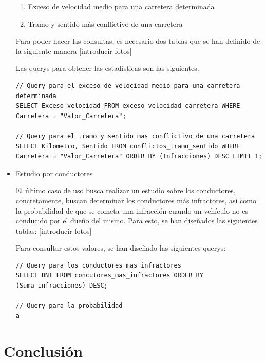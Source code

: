\documentclass[]{article}
\begin{document}
\begin{itemize}
    \begin{enumerate}
        \item Exceso de velocidad medio para una carretera determinada
        \item Tramo y sentido más conflictivo de una carretera 
    \end{enumerate}

    Para poder hacer las consultas, es necesario dos tablas que se han definido de la siguiente manera [introducir fotos]

    Las querys para obtener las estadísticas son las siguientes:

    \begin{lstlisting}[language=cql, caption=Querys para el caso de uso 2]
// Query para el exceso de velocidad medio para una carretera determinada
SELECT Exceso_velocidad FROM exceso_velocidad_carretera WHERE Carretera = "Valor_Carretera";

// Query para el tramo y sentido mas conflictivo de una carretera
SELECT Kilometro, Sentido FROM conflictos_tramo_sentido WHERE Carretera = "Valor_Carretera" ORDER BY (Infracciones) DESC LIMIT 1;
    \end{lstlisting}
 
    \item Estudio por conductores

    El último caso de uso busca realizar un estudio sobre los conductores, concretamente, buscan determinar los conductores más infractores, así como la probabilidad de que se cometa una infracción cuando un vehículo no es conducido por el dueño del mismo. Para esto, se han diseñados las siguientes tablas: [introducir fotos]

    Para consultar estos valores, se han diseñado las siguientes querys:

    \begin{lstlisting}[language=cql, caption=Querys para el caso de uso 3]
// Query para los conductores mas infractores
SELECT DNI FROM concutores_mas_infractores ORDER BY (Suma_infracciones) DESC;

// Query para la probabilidad
a

    \end{lstlisting}
\end{itemize}

\newpage
\section{Conclusión}
\label{sec:conclusion}
\end{document}
